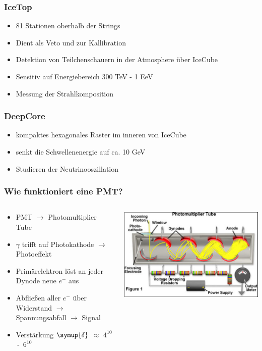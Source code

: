 \documentclass[aspectratio=1610, 9pt]{beamer}
\begin{document}
\begin{frame}\frametitle{IceTop}
  \begin{itemize}
    \item 81 Stationen oberhalb der Strings
    \item Dient als Veto und zur Kallibration
    \item Detektion von Teilchenschauern in der Atmosphere \"uber IceCube
    \item Sensitiv auf Energiebereich 300 TeV - 1 EeV
    \item Messung der Strahlkomposition
  \end{itemize}
\end{frame}

\begin{frame}\frametitle{DeepCore}
  \begin{itemize}
    \item kompaktes hexagonales Raster im inneren von IceCube
    \item senkt die Schwellenenergie auf ca. 10 GeV
    \item Studieren der Neutrinooszillation
  \end{itemize}
\end{frame}

\begin{frame}\frametitle{Wie funktioniert eine PMT?}
  \begin{columns}
    \begin{column}[c]{0.45\textwidth}
      \begin{itemize}
      \item PMT $\to$ Photomultiplier Tube
      \item $\gamma$ trifft auf Photokathode $\to$ Photoeffekt
      \item Prim\"arelektron l\"ost an jeder Dynode neue $e^{-}$ aus
      \item Abflie\ss en aller $e^{-}$ \"uber Widerstand $\to$ Spannungsabfall $\to$ Signal
      \item Verst\"arkung $\symup{\delta}$ $\approx$ $4^{10}$ \,-\, $6^{10}$
      \end{itemize}
    \end{column}
    \begin{column}[c]{0.45\textwidth}
      \includegraphics{images/pmt.png}
    \end{column}
  \end{columns}
\end{frame}
\end{document}
